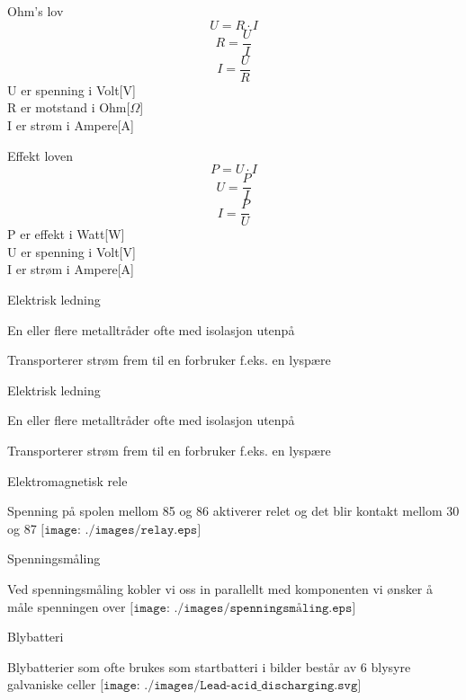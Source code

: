 \documentclass[avery5388,grid,frame]{flashcards}
\begin{document}




\begin{flashcard}{Ohm's lov}
\vskip 0.5cm
	$$U = R \cdot I$$
\vskip 0.5cm
	$$R = \frac{U}{I}$$ 
\vskip 0.5cm
	$$I = \frac{U}{R}$$ 
\vskip 0.5cm
	U er spenning i Volt[V]\\R er motstand i Ohm[$\Omega$]\\I er strøm i Ampere[A]
\end{flashcard}


\begin{flashcard}{Effekt loven}
\vskip 0.5cm
	$$P = U \cdot I$$
\vskip 0.5cm
	$$U = \frac{P}{I}$$ 
\vskip 0.5cm
	$$I = \frac{P}{U}$$ 
\vskip 0.5cm
P er effekt i Watt[W]\\U er spenning i Volt[V]\\I er strøm i Ampere[A]
\end{flashcard}




\begin{flashcard}{Elektrisk ledning}
		\begin{description}
			\item En eller flere metalltråder ofte med isolasjon utenpå
			\item Transporterer strøm frem til en forbruker f.eks. en lyspære
		\end{description}
\end{flashcard}
\begin{flashcard}{Elektrisk ledning}
		\begin{description}
			\item En eller flere metalltråder ofte med isolasjon utenpå
			\item Transporterer strøm frem til en forbruker f.eks. en lyspære
		\end{description}
\end{flashcard}
\begin{flashcard}{Elektromagnetisk rele}
	\begin{multicols}{2}
		Spenning på spolen mellom 85 og 86 aktiverer relet og det blir kontakt mellom 30 og 87
		\columnbreak
$\texttt{[image: ./images/relay.eps]}$
	\end{multicols}
\end{flashcard}

\begin{flashcard}{Spenningsmåling}
	\begin{multicols}{2}
		Ved spenningsmåling kobler vi oss in parallellt med komponenten vi ønsker å måle spenningen over
		\columnbreak
$\texttt{[image: ./images/spenningsmåling.eps]}$
	\end{multicols}
\end{flashcard}

\begin{flashcard}{Blybatteri}
	\begin{multicols}{2}
		Blybatterier som ofte brukes som startbatteri i bilder består av 6 blysyre galvaniske celler
		\columnbreak
$\texttt{[image: ./images/Lead-acid\_discharging.svg]}$
	\end{multicols}
\end{flashcard}
\end{document}
